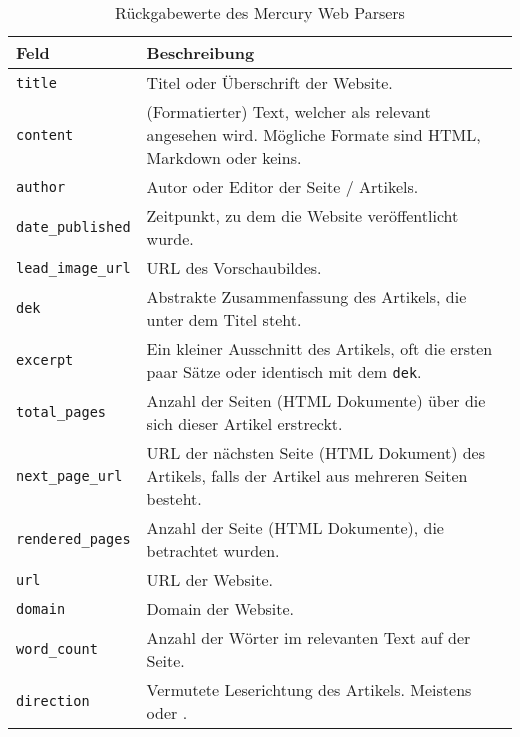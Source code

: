 \begin{table}
	\centering
	\begin{tabu}{lX}
		\toprule
		Feld & Beschreibung \\ \midrule
		\texttt{title} & Titel oder Überschrift der Website. \\
		\texttt{content} & (Formatierter) Text, welcher als relevant angesehen wird. Mögliche Formate sind HTML, Markdown oder keins. \\
		\texttt{author} & Autor oder Editor der Seite / Artikels. \\
		\texttt{date\_published} & Zeitpunkt, zu dem die Website veröffentlicht wurde. \\
		\texttt{lead\_image\_url} & URL des Vorschaubildes.  \\
		\texttt{dek} & Abstrakte Zusammenfassung des Artikels, die unter dem Titel steht. \\
		\texttt{excerpt} & Ein kleiner Ausschnitt des Artikels, oft die ersten paar Sätze oder identisch mit dem \texttt{dek}. \\
		\texttt{total\_pages} & Anzahl der Seiten (HTML Dokumente) über die sich dieser Artikel erstreckt.\\
		\texttt{next\_page\_url} & URL der nächsten Seite (HTML Dokument) des Artikels, falls der Artikel aus mehreren Seiten besteht. \\
		\texttt{rendered\_pages} & Anzahl der Seite (HTML Dokumente), die betrachtet wurden. \\
		\texttt{url} & URL der Website. \\
		\texttt{domain} & Domain der Website. \\
		\texttt{word\_count} & Anzahl der Wörter im relevanten Text auf der Seite. \\
		\texttt{direction} & Vermutete Leserichtung des Artikels. Meistens  oder . \\ \bottomrule
		
	\end{tabu}
\caption{Rückgabewerte des Mercury Web Parsers}
\label{extractor:table:mercury}
\end{table}


